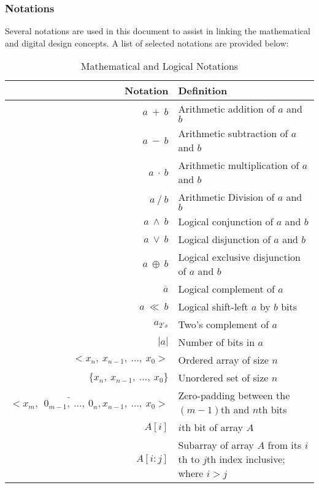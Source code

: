         \subsubsection{Notations} Several notations are used in this document
        to assist in linking the mathematical and digital design concepts. A
        list of selected notations are provided below:

        \begin{table}[!h]
            \def\arraystretch{2}
            \caption{Mathematical and Logical Notations}

            \centering
            \begin{tabular*}{470pt}{@{\extracolsep{\fill}} r p{9cm}}

            \textbf{Notation} & \textbf{Definition} \\
            \hline
            $a \ + \ b$ & Arithmetic addition of $a$ and $b$\\
            $a \ - \ b$ & Arithmetic subtraction of $a$ and $b$\\
            $a \ \cdot \ b$ & Arithmetic multiplication of $a$ and $b$\\
            $a \ / \ b$ & Arithmetic Division of $a$ and $b$\\
            $a \ \wedge \ b$ & Logical conjunction of $a$ and $b$\\
            $a \ \vee \ b$ & Logical disjunction of $a$ and $b$\\
            $a \ \oplus \ b$ & Logical exclusive disjunction of $a$ and $b$\\
            $\overline{a}$ & Logical complement of $a$\\
            $a \ \ll \ b$ & Logical shift-left $a$ by $b$ bits\\
            $a_{2's}$ & Two's complement of $a$\\
            $|a|$ & Number of bits in $a$\\
            $<x_{n}, \ x_{n-1}, \ \ldots, \ x_{0}>$ & Ordered array of size $n$
            \\
            $\{x_{n}, \ x_{n-1}, \ \ldots, \ x_{0}\}$ & Unordered set of size
            $n$ \\
            $< x_{m}, \ \ \overleftarrow{0_{m-1}, \ \ldots, \ 0_{n}}, x_{n-1},
            \
            \ldots, \ x_{0} >$ & Zero-padding between the $(m-1)$th and $n$th
            bits \\
            $A[i]$ & $i$th bit of array $A$ \\
            $A[i:j]$ & Subarray of array $A$ from its $i$th to $j$th index
            inclusive; where $i > j$ \\

            \end{tabular*}
        \end{table}

    \clearpage
    \newpage
